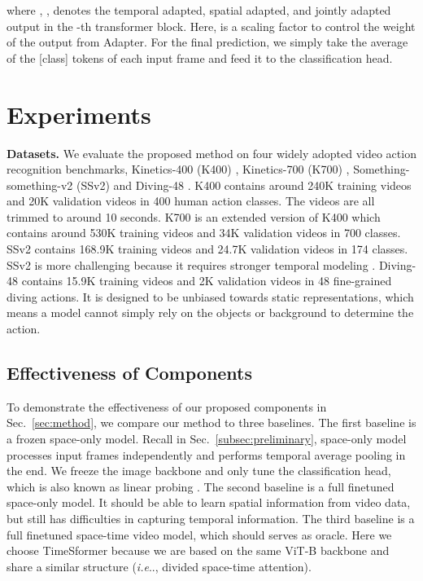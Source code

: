 \documentclass{article} \usepackage{iclr2023_conference,times}
\makeatletter
\DeclareRobustCommand\onedot{\futurelet\@let@token\@onedot}
\def\@onedot{\ifx\@let@token.\else.\null\fi\xspace}
\def\ie{\emph{i.e}\onedot} \def\Ie{\emph{I.e}\onedot}
\makeatother
\begin{document}
	
	
	where , ,  denotes the temporal adapted, spatial adapted, and jointly adapted output in the  -th transformer block. 
	Here,  is a scaling factor to control the weight of the output from Adapter. 
	For the final prediction, we simply take the average of the [class] tokens of each input frame and feed it to the classification head.
	
	
	\section{Experiments}
	\label{sec:experiments}
	
	\textbf{Datasets.} We evaluate the proposed method on four widely adopted video action recognition benchmarks, Kinetics-400 (K400) \citep{kay2017kinetics}, Kinetics-700 (K700) \citep{k700}, Something-something-v2 (SSv2) \citep{goyal2017something} and Diving-48 \citep{diving48}. K400 contains around 240K training videos and 20K validation videos in 400 human action classes. The videos are all trimmed to around 10 seconds. K700 is an extended version of K400 which contains around 530K training videos and 34K validation videos in 700 classes. SSv2 contains 168.9K training videos and 24.7K validation videos in 174 classes. 
	SSv2 is more challenging because it requires stronger temporal modeling \citep{zhu2020videosurvey,sevilla2021only}.
Diving-48 contains 15.9K training videos and 2K validation videos in 48 fine-grained diving actions. 
	It is designed to be unbiased towards static representations, which means a model cannot simply rely on the objects or background to determine the action. 
	\vspace{-2ex}
	\subsection{Effectiveness of Components}
	\label{subsec:baseline_exp}
	\vspace{-2ex}
	
	To demonstrate the effectiveness of our proposed components in Sec.\ \ref{sec:method}, we compare our method to three baselines. 
	The first baseline is a frozen space-only model. Recall in Sec.\ \ref{subsec:preliminary}, space-only model processes input frames independently and performs temporal average pooling in the end. We freeze the image backbone and only tune the classification head, which is also known as linear probing \citep{moco}. 
	The second baseline is a full finetuned space-only model. It should be able to learn spatial information from video data, but still has difficulties in capturing temporal information. 
	The third baseline is a full finetuned space-time video model, which should serves as oracle. 
	Here we choose TimeSformer \citep{timesformer} because we are based on the same ViT-B backbone and share a similar structure (\ie, divided space-time attention).
	
\end{document}
